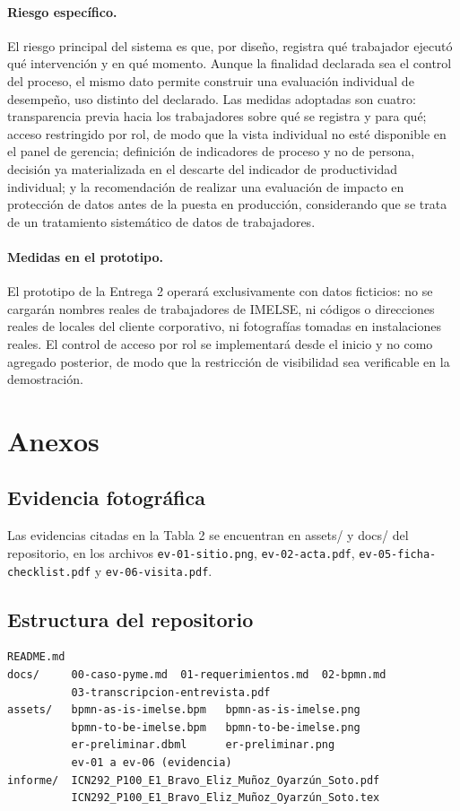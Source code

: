 \documentclass[10pt,letterpaper]{article}
\begin{document}
\paragraph{Riesgo específico.} El riesgo principal del sistema es que, por diseño,
registra qué trabajador ejecutó qué intervención y en qué momento. Aunque la finalidad
declarada sea el control del proceso, el mismo dato permite construir una evaluación
individual de desempeño, uso distinto del declarado. Las medidas adoptadas son cuatro:
transparencia previa hacia los trabajadores sobre qué se registra y para qué; acceso
restringido por rol, de modo que la vista individual no esté disponible en el panel de
gerencia; definición de indicadores de proceso y no de persona, decisión ya
materializada en el descarte del indicador de productividad individual; y la
recomendación de realizar una evaluación de impacto en protección de datos antes de la
puesta en producción, considerando que se trata de un tratamiento sistemático de datos
de trabajadores.

\paragraph{Medidas en el prototipo.} El prototipo de la Entrega 2 operará
exclusivamente con datos ficticios: no se cargarán nombres reales de trabajadores de
IMELSE, ni códigos o direcciones reales de locales del cliente corporativo, ni
fotografías tomadas en instalaciones reales. El control de acceso por rol se
implementará desde el inicio y no como agregado posterior, de modo que la restricción
de visibilidad sea verificable en la demostración.

\vspace{1.2cm}
\appendix
\section{Anexos}

\subsection{Evidencia fotográfica}

Las evidencias citadas en la Tabla 2 se encuentran en assets/ y docs/ del repositorio, en los archivos \texttt{ev-01-sitio.png}, \texttt{ev-02-acta.pdf},
\texttt{ev-05-ficha-checklist.pdf} y \texttt{ev-06-visita.pdf}.
\subsection{Estructura del repositorio}
\begin{verbatim}
README.md
docs/     00-caso-pyme.md  01-requerimientos.md  02-bpmn.md
          03-transcripcion-entrevista.pdf
assets/   bpmn-as-is-imelse.bpm   bpmn-as-is-imelse.png
          bpmn-to-be-imelse.bpm   bpmn-to-be-imelse.png
          er-preliminar.dbml      er-preliminar.png
          ev-01 a ev-06 (evidencia)
informe/  ICN292_P100_E1_Bravo_Eliz_Muñoz_Oyarzún_Soto.pdf
          ICN292_P100_E1_Bravo_Eliz_Muñoz_Oyarzún_Soto.tex
\end{verbatim}
\end{document}

